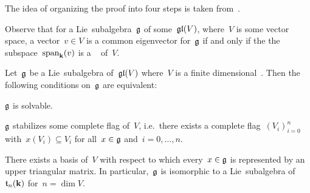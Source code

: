 \begin{remark}
 The idea of organizing the proof into four steps is taken from~\cite[\S 4.1]{Humphreys}.
\end{remark}


\begin{remark}
  Observe that for a Lie~subalgebra~$\glie$ of some~$\mathfrak{gl}(V)$, where~$V$ is some vector space, a vector~$v \in V$ is a common eigenvector for~$\glie$ if and only if the the subspace~$\operatorname{span}_{\mathbf{k}}(v)$ is a {\onedimensional}~{\subrepresentation{$\glie$}} of~$V$.
\end{remark}


\begin{proposition}
  \label{triangularization of solvable linear lie algebras}
  Let~$\glie$ be a Lie~subalgebra of~$\mathfrak{gl}(V)$ where~$V$ is a finite dimensional~{\vectorspace{$\kf$}}.
  Then the following conditions on~$\glie$ are equivalent:
  \begin{equivalenceslist}
    \item
      \label{is solvable}
      $\glie$ is solvable.
    \item
      \label{stabilizes a complete flag}
      $\glie$ stabilizes some complete flag of~$V$, i.e.\ there exists a complete flag~$(V_i)_{i=0}^n$ with~$x(V_i) \subseteq V_i$ for all~$x \in \mathfrak{g}$ and~$i = 0, \dotsc, n$.
    \item
      \label{is triangularizable}
      There exists a basis of~$V$ with respect to which every~$x \in \mathfrak{g}$ is represented by an upper triangular matrix.
      In particular,~$\glie$ is isomorphic to a Lie~subalgebra of~$\mathfrak{t}_n(\mathbf{k})$ for~$n = \dim V$.
  \end{equivalenceslist}
\end{proposition}


